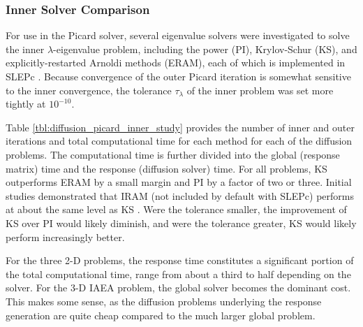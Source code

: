 \subsubsection{Inner Solver Comparison}

For use in the Picard solver, several eigenvalue solvers were investigated 
to solve the inner $\lambda$-eigenvalue problem, including the 
power (PI), Krylov-Schur (KS), and explicitly-restarted Arnoldi 
methods (ERAM), each of 
which is implemented in SLEPc \cite{slepc}.  Because convergence of the 
outer Picard iteration is somewhat sensitive to the inner convergence, 
the tolerance $\tau_{\lambda}$ of the inner problem was set 
more tightly at $10^{-10}$.  

Table \ref{tbl:diffusion_picard_inner_study} 
provides the number of inner and outer iterations and total
computational time for each method for each of the diffusion problems.
The computational time is further divided into the global (response matrix)
time and the response (diffusion solver) time.  For all problems, 
KS outperforms ERAM by a small margin and PI by a factor of two 
or three.  Initial studies demonstrated that IRAM (not included 
by default with SLEPc) performs at about the same level 
as KS \cite{roberts2012ksi}. Were the tolerance smaller, the improvement 
of KS over PI would 
likely diminish, and were the tolerance greater, KS would likely perform 
increasingly better.  

For the three 2-D problems, the response time constitutes a significant 
portion of the total computational time, range from about a third to half
depending on the solver.  For the 3-D IAEA problem, the global solver
becomes the dominant cost.  This makes some sense, as the diffusion 
problems underlying the response generation are quite cheap compared to 
the much larger global problem.

